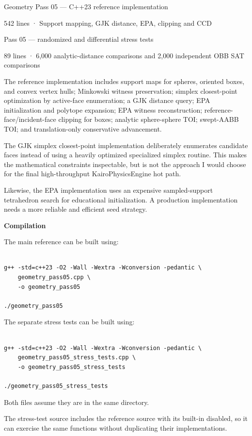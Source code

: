 Geometry Pass 05 --- C++23 reference implementation

542 lines · Support mapping, GJK distance, EPA, clipping and CCD

Pass 05 --- randomized and differential stress tests

89 lines · 6,000 analytic-distance comparisons and 2,000 independent OBB SAT comparisons

The reference implementation includes support maps for spheres, oriented boxes, and convex vertex hulls; Minkowski witness preservation; simplex closest-point optimization by active-face enumeration; a GJK distance query; EPA initialization and polytope expansion; EPA witness reconstruction; reference-face/incident-face clipping for boxes; analytic sphere-sphere TOI; swept-AABB TOI; and translation-only conservative advancement.

The GJK simplex closest-point implementation deliberately enumerates candidate faces instead of using a heavily optimized specialized simplex routine. This makes the mathematical constraints inspectable, but is not the approach I would choose for the final high-throughput KairoPhysicsEngine hot path.

Likewise, the EPA implementation uses an expensive sampled-support tetrahedron search for educational initialization. A production implementation needs a more reliable and efficient seed strategy.

\textbf{Compilation}

The main reference can be built using:

\begin{verbatim}

g++ -std=c++23 -O2 -Wall -Wextra -Wconversion -pedantic \
    geometry_pass05.cpp \
    -o geometry_pass05

./geometry_pass05
\end{verbatim}

The separate stress tests can be built using:

\begin{verbatim}

g++ -std=c++23 -O2 -Wall -Wextra -Wconversion -pedantic \
    geometry_pass05_stress_tests.cpp \
    -o geometry_pass05_stress_tests

./geometry_pass05_stress_tests
\end{verbatim}

Both files assume they are in the same directory.

The stress-test source includes the reference source with its built-in  disabled, so it can exercise the same functions without duplicating their implementations.

